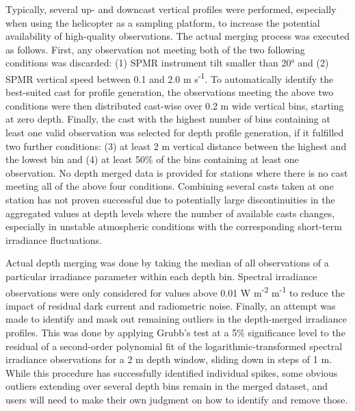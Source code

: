 \documentclass[essd, manuscript]{copernicus}
\begin{document}
Typically, several up- and downcast vertical profiles were performed, especially when using the helicopter as a sampling platform, to increase the potential availability of high-quality observations. The actual merging process was executed as follows. First, any observation not meeting both of the two following conditions was discarded: (1) SPMR instrument tilt smaller than 20° and (2) SPMR vertical speed between 0.1 and 2.0 m s\textsuperscript{-1}. To automatically identify the best-suited cast for profile generation, the observations meeting the above two conditions were then distributed cast-wise over 0.2 m wide vertical bins, starting at zero depth. Finally, the cast with the highest number of bins containing at least one valid observation was selected for depth profile generation, if it fulfilled two further conditions: (3) at least 2 m vertical distance between the highest and the lowest bin and (4) at least 50\% of the bins containing at least one observation. No depth merged data is provided for stations where there is no cast meeting all of the above four conditions. Combining several casts taken at one station has not proven successful due to potentially large discontinuities in the aggregated values at depth levels where the number of available casts changes, especially in unstable atmospheric conditions with the corresponding short-term irradiance fluctuations.

Actual depth merging was done by taking the median of all observations of a particular irradiance parameter within each depth bin. Spectral irradiance observations were only considered for values above 0.01 W m\textsuperscript{-2} \textmu m\textsuperscript{-1} to reduce the impact of residual dark current and radiometric noise. Finally, an attempt was made to identify and mask out remaining outliers in the depth-merged irradiance profiles. This was done by applying Grubb's test at a 5\% significance level \citep{Guthrie2012} to the residual of a second-order polynomial fit of the logarithmic-transformed spectral irradiance observations for a 2 m depth window, sliding down in steps of 1 m. While this procedure has successfully identified individual spikes, some obvious outliers extending over several depth bins remain in the merged dataset, and users will need to make their own judgment on how to identify and remove those.
\end{document}
